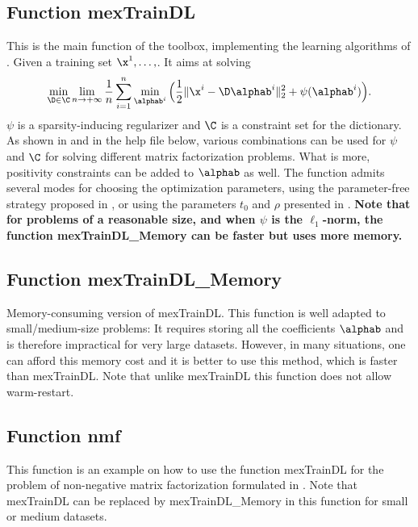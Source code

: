 \documentclass[a4paper, 11pt]{article}
\begin{document}
\subsection{Function mexTrainDL}
This is the main function of the toolbox, implementing the learning algorithms of \cite{mairal9}. 
Given a training set $\x^1,\ldots,  $. It aims at solving
\begin{equation}
   \min_{\D \in \C} \lim_{n \to +\infty} \frac{1}{n} \sum_{i=1}^n \min_{\alphab^i} \Big( \frac{1}{2} \|\x^i-\D\alphab^i\|_2^2 + \psi(\alphab^i)\Big).
\end{equation}
$\psi$ is a sparsity-inducing regularizer and $\C$ is a constraint set for the dictionary. As shown in \cite{mairal9} 
and in the help file below, various combinations can be used for $\psi$ and $\C$ for solving different matrix factorization problems.
What is more, positivity constraints can be added to $\alphab$ as well. The function admits several modes for choosing the optimization parameters, using the parameter-free strategy proposed in \cite{mairal7}, or using the parameters $t_0$ and $\rho$ presented
in \cite{mairal9}. {\bf Note that for problems of a reasonable size, and when $\psi$ is the $\ell_1$-norm, 
the function mexTrainDL\_Memory can be faster but uses more memory.} 
{\footnotesize

}

\subsection{Function mexTrainDL\_Memory}
Memory-consuming version of mexTrainDL. This function is well adapted to small/medium-size problems:
It requires storing all the coefficients $\alphab$ and is therefore impractical
for very large datasets. However, in many situations, one can afford this memory cost and it is better to use this method, which 
is faster than mexTrainDL.
Note that unlike mexTrainDL this function does not allow warm-restart.
{\footnotesize

}

\subsection{Function nmf}
This function is an example on how to use the function mexTrainDL for the
problem of non-negative matrix factorization formulated in \cite{lee2}.  Note
that mexTrainDL can be replaced by mexTrainDL\_Memory in this function for
small or medium datasets.
\end{document}
